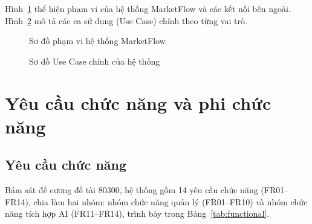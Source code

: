 Hình~\ref{fig:context} thể hiện phạm vi của hệ thống MarketFlow và các kết nối bên ngoài. Hình~\ref{fig:usecase} mô tả các ca sử dụng (Use Case) chính theo từng vai trò.

\begin{figure}[!htbp]
\centering
\vspace{2pt}

\vspace{2pt}
\caption{Sơ đồ phạm vi hệ thống MarketFlow}
\label{fig:context}
\end{figure}

\begin{figure}[!htbp]
\centering
\vspace{2pt}

\vspace{2pt}
\caption{Sơ đồ Use Case chính của hệ thống}
\label{fig:usecase}
\end{figure}

\section{Yêu cầu chức năng và phi chức năng}

\subsection{Yêu cầu chức năng}

Bám sát đề cương đề tài 80300, hệ thống gồm 14 yêu cầu chức năng (FR01--FR14), chia làm hai nhóm: nhóm chức năng quản lý (FR01--FR10) và nhóm chức năng tích hợp AI (FR11--FR14), trình bày trong Bảng~\ref{tab:functional}.

